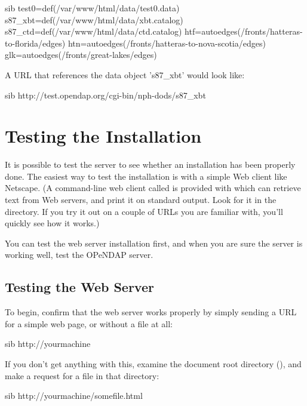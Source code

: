 \documentclass{dods-book}
\begin{document}
\begin{vcode}{sib} 
test0=def(/var/www/html/data/test0.data)
s87_xbt=def(/var/www/html/data/xbt.catalog)
s87_ctd=def(/var/www/html/data/ctd.catalog)
htf=autoedges(/fronts/hatteras-to-florida/edges)
htn=autoedges(/fronts/hatteras-to-nova-scotia/edges)
glk=autoedges(/fronts/great-lakes/edges)
\end{vcode}

A URL that references the data object 's87_xbt' would look like:
  
\begin{vcode}{sib}
http://test.opendap.org/cgi-bin/nph-dods/s87_xbt  
\end{vcode}

\chapter{Testing the Installation}
\label{server,testing}

 It is possible to
test the server to see whether an installation has been properly done.
The easiest way to test the installation is with a simple Web client
like Netscape. (A command-line web client called  is
provided with  which can retrieve text from Web servers,
and print it on standard output. Look for it in the
 directory. If you try it out on a couple of URLs
you are familiar with, you'll quickly see how it works.) 

You can test the web server installation first, and when you are sure
the server is working well, test the OPeNDAP server.

\section{Testing the Web Server}

To begin, confirm that the web server works properly by simply sending a
URL for a simple web page, or without a file at all:

\begin{vcode}{sib}
http://yourmachine
\end{vcode}

If you don't get anything with this, examine the document root
directory (), and make a request for a file in that
directory:

\begin{vcode}{sib}
http://yourmachine/somefile.html
\end{vcode}
\end{document}
